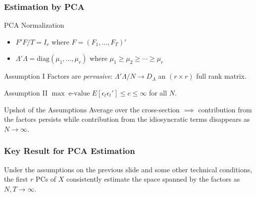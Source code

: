 \begin{frame}
\frametitle{Estimation by PCA}

\small

\begin{block}
	{PCA Normalization}
		\begin{itemize}
			\item $F'F/T = I_r$ where $F = (F_1, \hdots, F_T)'$
			\item $\Lambda' \Lambda =\mbox{diag}(\mu_1, \hdots, \mu_r)$ where $\mu_1 \geq \mu_2 \geq \cdots \geq \mu_r$
		\end{itemize}
\end{block}
	
\begin{block}
	{Assumption I}
	Factors are \emph{pervasive}: $\Lambda' \Lambda/N \rightarrow D_\Lambda$ an $(r\times r)$ full rank matrix.
\end{block}

\begin{block}
	{Assumption II}
	$\max \;\mbox{e-value}\; E[\epsilon_t\epsilon_t']\leq c \leq \infty$ for all $N$.
\end{block}

\begin{block}
	{Upshot of the Assumptions}
Average over the cross-section $\implies$ contribution from the factors persists while contribution from the idiosyncratic terms disappears as $N\rightarrow \infty$.
\end{block}

\end{frame}
\begin{frame}
	\frametitle{Key Result for PCA Estimation}
	Under the assumptions on the previous slide and some other technical conditions, the first $r$ PCs of $X$ consistently estimate the space spanned by the factors as $N,T \rightarrow \infty$.
\end{frame}
